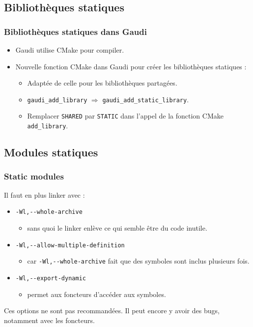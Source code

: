\documentclass{beamer}
\begin{document}
\subsection{Bibliothèques statiques}

\begin{frame}[fragile]
    \frametitle{Bibliothèques statiques dans Gaudi}

    \begin{itemize}
        \item Gaudi utilise CMake pour compiler.
        \item Nouvelle fonction CMake dans Gaudi pour créer les bibliothèques statiques :
              \begin{itemize}
                  \item Adaptée de celle pour les bibliothèques partagées.
                  \item \verb'gaudi_add_library' $\Rightarrow$ \verb'gaudi_add_static_library'.
                  \item Remplacer \verb'SHARED' par \verb'STATIC' dans l'appel de la fonction CMake \verb'add_library'.
              \end{itemize}
    \end{itemize}
\end{frame}

\subsection{Modules statiques}

\begin{frame}[fragile]
    \frametitle{Static modules}

    Il faut en plus linker avec :
    \begin{itemize}
        \item \verb'-Wl,--whole-archive'
              \begin{itemize}
                  \item sans quoi le linker enlève ce qui semble être du code inutile.
              \end{itemize}
        \item \verb'-Wl,--allow-multiple-definition'
              \begin{itemize}
                  \item car \verb'-Wl,--whole-archive' fait que des symboles sont inclus plusieurs fois.
              \end{itemize}
        \item \verb'-Wl,--export-dynamic'
              \begin{itemize}
                  \item permet aux foncteurs d'accéder aux symboles.
              \end{itemize}
    \end{itemize}

    Ces options ne sont pas recommandées.
    Il peut encore y avoir des bugs, notamment avec les foncteurs.
\end{frame}
\end{document}
